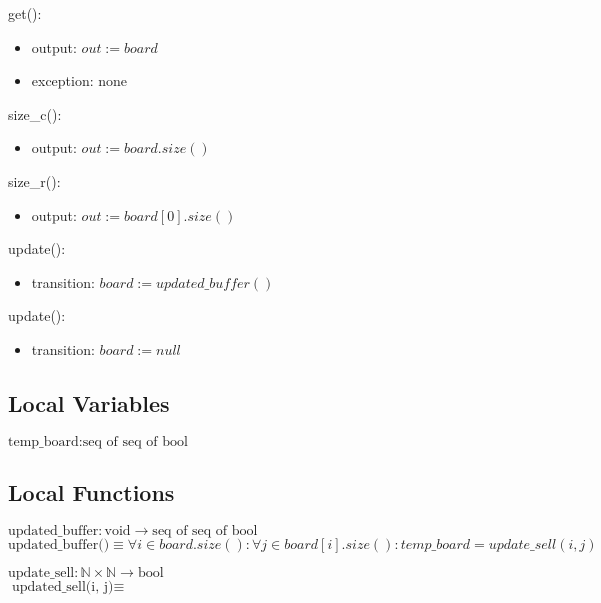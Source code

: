 \documentclass[12pt]{article}
\begin{document}
\noindent get():
\begin{itemize}
\item output: $out := board$
\item exception: none
\end{itemize}

\noindent size\_c():
\begin{itemize}
\item output:  $out := board.size()$

\end{itemize}

\noindent size\_r():
\begin{itemize}
\item output: $out := board[0].size()$

\end{itemize}

\noindent update():
\begin{itemize}
\item transition: $board := updated\_buffer()$
\end{itemize}

\noindent update():
\begin{itemize}
\item transition: $board := null$
\end{itemize}


\subsection*{Local Variables}

\noindent $\text{temp\_board} : \text{seq of seq of bool}$

\subsection*{Local Functions}

\noindent $\text{updated\_buffer} : \text{void} \rightarrow \text{seq of seq of bool}$\\
\noindent $\text{updated\_buffer()} \equiv \forall i \in board.size() : \forall j \in board[i].size() : temp\_board = update\_sell(i ,j)$

\noindent $\text{update\_sell} : \mathbb{N} \times \mathbb{N} \rightarrow \text{bool}$\\
\noindent $\text{updated\_sell(i, j)} \equiv $
\end{document}
